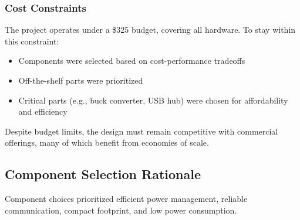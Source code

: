 \documentclass[12pt]{article}
\begin{document}
\subsubsection{Cost Constraints}

The project operates under a \$325 budget, covering all hardware. To stay within this constraint:
\begin{itemize}
    \item Components were selected based on cost-performance tradeoffs
    \item Off-the-shelf parts were prioritized
    \item Critical parts (e.g., buck converter, USB hub) were chosen for affordability and efficiency
\end{itemize}

Despite budget limits, the design must remain competitive with commercial offerings, many of which benefit from economies of scale.

\subsection{Component Selection Rationale}

Component choices prioritized efficient power management, reliable communication, compact footprint, and low power consumption.
\end{document}

